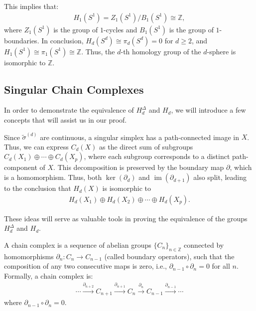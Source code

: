 \begin{example}
	This implies that:
	\begin{align}
		H_{1}(S^{1}) = Z_{1}(S^{1}) / B_{1}(S^{1}) \cong \mathbb{Z}, 
	\end{align}
	where \( Z_{1}(S^{1}) \) is the group of \( 1 \)-cycles and \( B_{1}(S^{1}) \) is the group of \( 1 \)-boundaries. In conclusion, \( H_{d}(S^{d}) \cong \pi_{d}(S^{d}) = 0 \) for \( d \geq 2 \), and \( H_{1}(S^{1}) \cong \pi_{1}(S^{1}) \cong \mathbb{Z} \). Thus, the \( d \)-th homology group of the \( d \)-sphere is isomorphic to \(\mathbb{Z}\).
\end{example}


\subsection{Singular Chain Complexes}
\label{SingularChainComplexes}
In order to demonstrate the equivalence of \( H_{d}^{\Delta} \) and \( H_{d} \), we will introduce a few concepts that will assist us in our proof.

Since \( \tilde{\sigma}^{(d)} \) are continuous, a singular simplex has a path-connected image in \( X \). Thus, we can express \( C_{d}(X) \) as the direct sum of subgroups \( C_{d}(X_{1}) \oplus \cdots \oplus C_{d}(X_{p}) \), where each subgroup corresponds to a distinct path-component of \( X \). This decomposition is preserved by the boundary map \( \partial \), which is a homomorphism. Thus, both \( \ker(\partial_{d}) \) and \( \operatorname{im}(\partial_{d+1}) \) also split, leading to the conclusion that \( H_{d}(X) \) is isomorphic to
\begin{align}
	H_{d}(X_{1}) \oplus H_{d}(X_{2}) \oplus \cdots \oplus H_{d}(X_{p}). 
\end{align}

These ideas will serve as valuable tools in proving the equivalence of the groups \( H_{d}^{\Delta} \) and \( H_{d} \).

\begin{definition}
	\label{ChainComplex}
	A chain complex is a sequence of abelian groups \(\{C_n\}_{n \in \mathbb{Z}}\) connected by homomorphisms \(\partial_n: C_n \to C_{n-1}\) (called boundary operators), such that the composition of any two consecutive maps is zero, i.e., \(\partial_{n-1} \circ \partial_n = 0\) for all \(n\). Formally, a chain complex is:
	\begin{align}
		\cdots \xrightarrow{\partial_{n+2}} C_{n+1} \xrightarrow{\partial_{n+1}} C_n \xrightarrow{\partial_n} C_{n-1} \xrightarrow{\partial_{n-1}} \cdots 
	\end{align}
	where \(\partial_{n-1} \circ \partial_n = 0\).
\end{definition}

